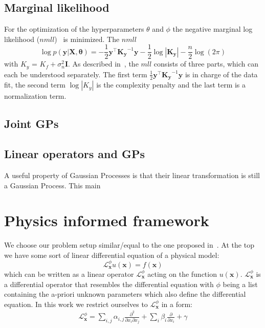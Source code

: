 \documentclass{article}
\begin{document}
\subsection{Marginal likelihood}

For the optimization of the hyperparameters $\theta$ and $\phi$ the negative
marginal log likelihood ($nmll$)~\cite{RasmussenCarlEdward} is minimized. The
$nmll$
\begin{equation}
    \label{eq:nmll}
    \log p(\bm{y}|\bm{X},\bm{\theta}) = -\frac{1}{2}\bm{y}^\intercal \bm{K_y}^{-1}\bm{y} - \frac{1}{2}\log\left\lvert \bm{K_y}\right\rvert - \frac{n}{2}\log(2\pi)
\end{equation}
with $K_y$ = $K_f + \sigma_n^2 \bm{I}$. As described in~\cite{RasmussenCarlEdward}, the $mll$ consists of three parts, which can each be understood separately. The first term $\frac{1}{2}\bm{y}^\intercal \bm{K_y}^{-1}\bm{y}$ is in charge of the data fit, the second term $\log\left\lvert K_y\right\rvert$ is the complexity penalty and the last term is a normalization term.

\subsection{Joint GPs}

\subsection{Linear operators and GPs}
A useful property of Gaussian Processes is that their linear transformation is
still a Gaussian Process. This main

\section{Physics informed framework}
We choose our problem setup similar/equal to the one proposed in~\cite{RAISSI}. At the top we 
have some sort of linear differential equation of a physical model:
\begin{equation}
    \label{eq:Lu=f}
    \mathcal{L}_{\bm{x}}^\phi u(\bm{x}) = f(\bm{x})
\end{equation}
which can be written as a linear operator $\mathcal{L}_{\bm{x}}^\phi$ acting on the function $u(\bm{x})$. $\mathcal{L}_{\bm{x}}^\phi$ is a differential operator that resembles the differential equation with $\phi$ being a list containing the a-priori unknown parameters which also define the differential equation. In this work we restrict ourselves to $\mathcal{L}_{\bm{x}}^\phi$ in a form:
\begin{align}
\mathcal{L}_{\bm{x}}^\phi = \sum_{i,j} \alpha_{i,j} \frac{\partial^2 }{\partial x_i \partial x_j} + \sum_{i} \beta_i \frac{\partial}{\partial x_i} + \gamma 
\end{align}
\end{document}
